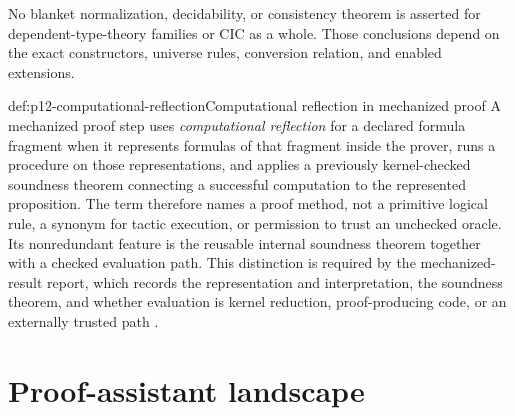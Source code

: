 No blanket normalization, decidability, or consistency theorem is asserted
for dependent-type-theory families or CIC as a whole.  Those conclusions
depend on the exact constructors, universe rules, conversion relation, and
enabled extensions.

\begin{hbdefinition}{def:p12-computational-reflection}{Computational reflection in mechanized proof}
A mechanized proof step uses \emph{computational reflection} for a declared
formula fragment when it represents formulas of that fragment inside the
prover, runs a procedure on those representations, and applies a previously
kernel-checked soundness theorem connecting a successful computation to the
represented proposition.  The term therefore names a proof method, not a
primitive logical rule, a synonym for tactic execution, or permission to trust
an unchecked oracle.  Its nonredundant feature is the reusable internal
soundness theorem together with a checked evaluation path.  This distinction
is required by the mechanized-result report, which records the representation
and interpretation, the soundness theorem, and whether evaluation is kernel
reduction, proof-producing code, or an externally trusted path
\cite{Harrison1995Reflection}.
\end{hbdefinition}

\section{Proof-assistant landscape}

